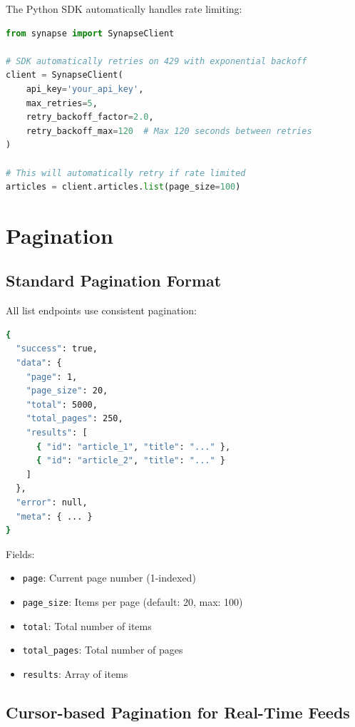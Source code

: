 \documentclass{report}
\begin{document}
The Python SDK automatically handles rate limiting:

\begin{lstlisting}[language=Python]
from synapse import SynapseClient

# SDK automatically retries on 429 with exponential backoff
client = SynapseClient(
    api_key='your_api_key',
    max_retries=5,
    retry_backoff_factor=2.0,
    retry_backoff_max=120  # Max 120 seconds between retries
)

# This will automatically retry if rate limited
articles = client.articles.list(page_size=100)
\end{lstlisting}

\chapter{Pagination}

\section{Standard Pagination Format}

All list endpoints use consistent pagination:

\begin{lstlisting}[language=bash]
{
  "success": true,
  "data": {
    "page": 1,
    "page_size": 20,
    "total": 5000,
    "total_pages": 250,
    "results": [
      { "id": "article_1", "title": "..." },
      { "id": "article_2", "title": "..." }
    ]
  },
  "error": null,
  "meta": { ... }
}
\end{lstlisting}

Fields:

\begin{itemize}
    \item \texttt{page}: Current page number (1-indexed)
    \item \texttt{page\_size}: Items per page (default: 20, max: 100)
    \item \texttt{total}: Total number of items
    \item \texttt{total\_pages}: Total number of pages
    \item \texttt{results}: Array of items
\end{itemize}

\section{Cursor-based Pagination for Real-Time Feeds}
\end{document}
